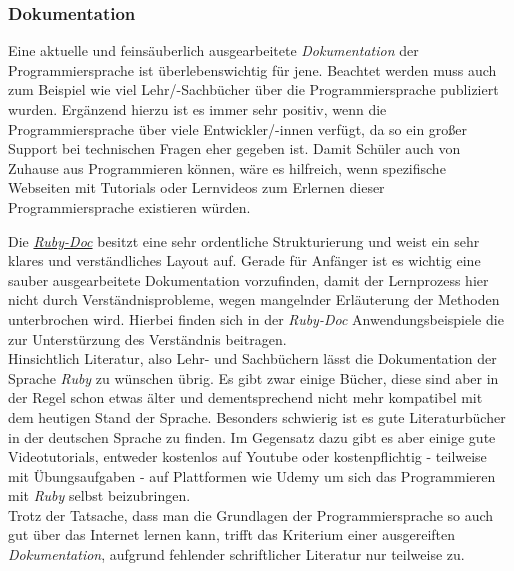 \documentclass[12pt,DIV=14, version=first, BCOR=10mm,a4paper,twoside,parskip=half-,headsepline,headinclude]{scrartcl}
\begin{document}
\subsubsection{Dokumentation}
\begin{flushleft}
Eine aktuelle und feinsäuberlich ausgearbeitete \textit{Dokumentation} der Programmiersprache ist überlebenswichtig für jene. Beachtet werden muss auch zum Beispiel wie viel Lehr/-Sachbücher über die Programmiersprache publiziert wurden. Ergänzend hierzu ist es immer sehr positiv, wenn die Programmiersprache über viele Entwickler/-innen verfügt, da so ein großer Support bei technischen Fragen eher gegeben ist. Damit Schüler auch von Zuhause aus Programmieren können, wäre es hilfreich, wenn spezifische Webseiten mit Tutorials oder Lernvideos zum Erlernen dieser Programmiersprache existieren würden.

Die \href {https://ruby-doc.org/}{\textit{\glqq Ruby-Doc\grqq}} besitzt eine sehr ordentliche Strukturierung und weist ein sehr klares und verständliches Layout auf. Gerade für Anfänger ist es wichtig eine sauber ausgearbeitete Dokumentation vorzufinden, damit der Lernprozess hier nicht durch Verständnisprobleme, wegen mangelnder Erläuterung der Methoden unterbrochen wird. Hierbei finden sich in der \textit{\glqq Ruby-Doc\grqq} Anwendungsbeispiele die zur Unterstürzung des Verständnis beitragen. \\
Hinsichtlich Literatur, also Lehr- und Sachbüchern lässt die Dokumentation der Sprache \textit{\glqq Ruby\grqq} zu wünschen übrig. Es gibt zwar einige Bücher, diese sind aber in der Regel schon etwas älter und dementsprechend nicht mehr kompatibel mit dem heutigen Stand der Sprache. Besonders schwierig ist es gute Literaturbücher in der deutschen Sprache zu finden. Im Gegensatz dazu gibt es aber einige gute Videotutorials, entweder kostenlos auf Youtube oder kostenpflichtig - teilweise mit Übungsaufgaben - auf Plattformen wie {\glqq Udemy\grqq} um sich das Programmieren mit \textit{\glqq Ruby\grqq} selbst beizubringen.\\
Trotz der Tatsache, dass man die Grundlagen der Programmiersprache so auch gut über das Internet lernen kann, trifft das Kriterium einer ausgereiften \textit{Dokumentation}, aufgrund fehlender schriftlicher Literatur nur teilweise zu.
\end{flushleft}
\end{document}

